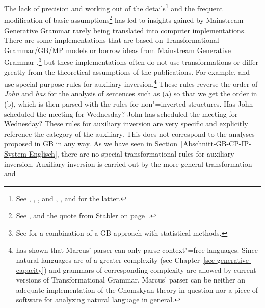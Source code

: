 The lack of precision and working out of the details\footnote{%
	See \eg {}, , ,  and , ,  and
   for the latter. 
} and the frequent modification of basic assumptions\footnote{%
	See \eg {},  and the quote from Stabler on page~\pageref{Zitat-Stabler}.
} has led to insights gained by Mainstream Generative Grammar rarely being translated into computer implementations.
There are some implementations that are based on Transformational Grammar/GB/MP models or borrow ideas from Mainstream
Generative Grammar
\citep*{Petrick65a-u,ZFHW65a,Kay67a,Friedman69a,FBDPM71a-u,Plath73a,Morin73a-u,Marcus80a-u,AC86a,Kuhns86a,Correra87a,Stabler87a,Stabler92a-u,Stabler2001a,KT91a,Fong91a-u,CL92a,Lohnstein93a-u,Lin93a,FC94a,Nordgard94a,Veenstra98a,%
FG2012a%
},\footnote{%
  See  for a combination of a GB approach with statistical methods.
}
but these implementations often do not use transformations or differ greatly from the theoretical assumptions of the
publications. For example, \citet[--104]{Marcus80a-u} and
\citet[]{Stabler87a} use special purpose rules for auxiliary inversion.\footnote{%
  \citet{NF86a-u,NF87a-u} has shown that Marcus' parser can only parse context"=free languages. Since natural languages
  are of a greater complexity (see Chapter~\ref{sec-generative-capacity}) and grammars of corresponding complexity
  are allowed by current versions of Transformational Grammar, Marcus' parser can be neither an adequate implementation of
  the Chomskyan theory in question nor a piece of software for analyzing natural language in general.
}
These rules reverse the order of \emph{John} and \emph{has} for the analysis of sentences such as (a) so that we get the order in
  (b), which is then parsed with the rules for non"=inverted structures.
\eal
\ex Has John scheduled the meeting for Wednesday?
\ex John has scheduled the meeting for Wednesday?
\zl
These rules for auxiliary inversion are very specific and explicitly reference the category of the auxiliary. This does not correspond
to the analyses proposed in GB in any way. As we have seen in
Section~\ref{Abschnitt-GB-CP-IP-System-Englisch}, there are no special transformational rules for auxiliary inversion. Auxiliary inversion is carried out by the more general transformation \movealpha and
